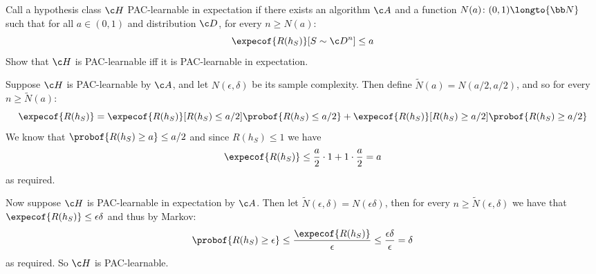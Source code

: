 \bexerc

    Call a hypothesis class $\c H$ {\emphcolor PAC-learnable in expectation} if there exists an algorithm $\c A$ and a function $N(a)\colon(0,1)\longto{\bb N}$ such that for all $a\in(0,1)$ and distribution
    $\c D$, for every $n\geq N(a)$:
    $$ \expecof{R(h_S)}[S\sim\c D^n] \leq a $$
    Show that $\c H$ is PAC-learnable iff it is PAC-learnable in expectation.

\eexerc

Suppose $\c H$ is PAC-learnable by $\c A$, and let $N(\epsilon,\delta)$ be its sample complexity.
Then define $\tilde N(a)=N(a/2,a/2)$, and so for every $n\geq \tilde N(a)$:
$$ \expecof{R(h_S)} = \expecof{R(h_S)}[R(h_S)\leq a/2]\probof{R(h_S)\leq a/2} + \expecof{R(h_S)}[R(h_S)\geq a/2]\probof{R(h_S)\geq a/2} $$
We know that $\probof{R(h_S)\geq a}\leq a/2$ and since $R(h_S)\leq1$ we have
$$ \expecof{R(h_S)} \leq \frac a2\cdot1 + 1\cdot\frac a2 = a $$
as required.

Now suppose $\c H$ is PAC-learnable in expectation by $\c A$.
Then let $\tilde N(\epsilon,\delta)=N(\epsilon\delta)$, then for every $n\geq\tilde N(\epsilon,\delta)$ we have that $\expecof{R(h_S)}\leq\epsilon\delta$ and thus by Markov:
$$ \probof{R(h_S)\geq\epsilon} \leq \frac{\expecof{R(h_S)}}\epsilon \leq \frac{\epsilon\delta}\epsilon = \delta $$
as required.
So $\c H$ is PAC-learnable.

\bye

